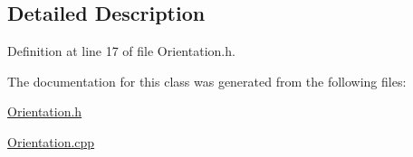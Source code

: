 \subsection{Detailed Description}


Definition at line 17 of file Orientation.\+h.



The documentation for this class was generated from the following files\+:\begin{DoxyCompactItemize}
\item 
\hyperlink{_orientation_8h}{Orientation.\+h}\item 
\hyperlink{_orientation_8cpp}{Orientation.\+cpp}\end{DoxyCompactItemize}
